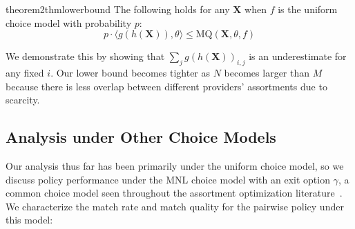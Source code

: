\documentclass[11pt]{article}
\begin{document}
\begin{restatable}{theorem2}{thmlowerbound}
    \label{thm:lower_bound}
    The following holds for any $\mathbf{X}$ when $f$ is the uniform choice model with probability $p$:
    {\small \begin{equation}
        p \cdot \langle g(h(\mathbf{X})), \theta \rangle \leq \mathrm{MQ}(\mathbf{X},\theta,f)
    \end{equation}}
\end{restatable}

We demonstrate this by showing that $\sum_{j} g(h(\mathbf{X}))_{i,j}$ is an underestimate for any fixed $i$. 
Our lower bound becomes tighter as $N$ becomes larger than $M$ because there is less overlap between different providers' assortments due to scarcity. 

\subsection{Analysis under Other Choice Models}
\label{sec:beyond_uniform_choice}
Our analysis thus far has been primarily under the uniform choice model, so we discuss policy performance under the MNL choice model with an exit option $\gamma$, a common choice model seen throughout the assortment optimization literature~\citep{assortment_mnl}. 
We characterize the match rate and match quality for the pairwise policy under this model: 
\end{document}
